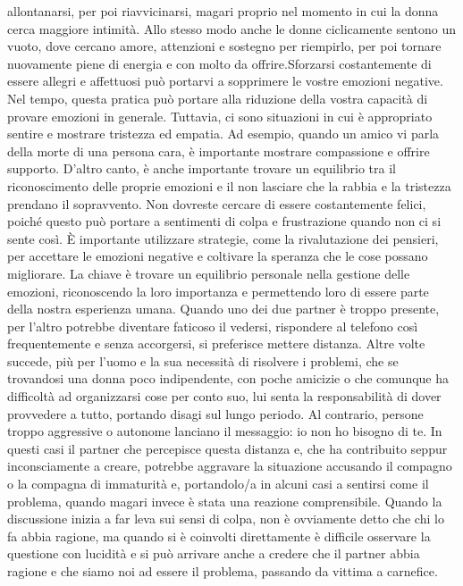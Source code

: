 \documentclass[12pt]{book} %
\begin{document}
allontanarsi, per poi riavvicinarsi, magari proprio nel momento in cui la donna cerca maggiore intimità. Allo stesso
modo anche le donne ciclicamente sentono un vuoto, dove cercano amore, attenzioni e sostegno per riempirlo, per poi
tornare nuovamente piene di energia e con molto da offrire.Sforzarsi costantemente di essere allegri e affettuosi può
portarvi a sopprimere le vostre emozioni negative. Nel tempo, questa pratica può portare alla riduzione della vostra
capacità di provare emozioni in generale. Tuttavia, ci sono situazioni in cui è appropriato sentire e mostrare
tristezza ed empatia. Ad esempio, quando un amico vi parla della morte di una persona cara, è importante mostrare
compassione e offrire supporto. D'altro canto, è anche importante trovare un equilibrio tra il riconoscimento delle
proprie emozioni e il non lasciare che la rabbia e la tristezza prendano il sopravvento. Non dovreste cercare di essere
costantemente felici, poiché questo può portare a sentimenti di colpa e frustrazione quando non ci si sente così. È
importante utilizzare strategie, come la rivalutazione dei pensieri, per accettare le emozioni negative e coltivare la
speranza che le cose possano migliorare. La chiave è trovare un equilibrio personale nella gestione delle emozioni,
riconoscendo la loro importanza e permettendo loro di essere parte della nostra esperienza
umana. Quando uno dei due
partner è troppo presente, per l'altro potrebbe diventare faticoso il vedersi, rispondere al
telefono così frequentemente e senza accorgersi, si preferisce mettere distanza. Altre volte succede, più per
l'uomo e la sua necessità di risolvere i problemi, che se trovandosi una donna poco indipendente,
con poche amicizie o che comunque ha difficoltà ad organizzarsi cose per conto suo, lui senta la responsabilità di
dover provvedere a tutto, portando disagi sul lungo periodo. Al contrario, persone troppo aggressive o autonome
lanciano il messaggio: io non ho bisogno di te. In questi casi il partner che percepisce questa distanza e, che ha
contribuito seppur inconsciamente a creare, potrebbe aggravare la situazione accusando il compagno o la compagna di
immaturità e, portandolo/a in alcuni casi a sentirsi come il problema, quando magari invece è stata una reazione
comprensibile. Quando la discussione inizia a far leva sui sensi di colpa, non è ovviamente detto che chi lo fa abbia
ragione, ma quando si è coinvolti direttamente è difficile osservare la questione con lucidità e si può arrivare anche
a credere che il partner abbia ragione e che siamo noi ad essere il problema, passando da vittima a carnefice.
\end{document}
